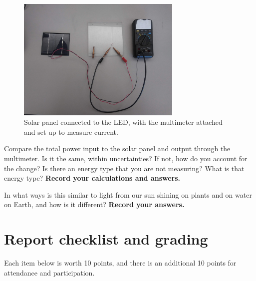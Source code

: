 \begin{steps}
\begin{figure}
	\centering
	\includegraphics[width=0.7\textwidth]{energy-trans/solar-led-ma}
	\caption{Solar panel connected to the LED, with the multimeter attached and set up to measure current.}\label{et:fig:solar-led-ma}
\end{figure}

	\item Compare the total power input to the solar panel and output through the multimeter. Is it the same, within uncertainties? If not, how do you account for the change? Is there an energy type that you are not measuring? What is that energy type? \textbf{Record your calculations and answers.}
	
	\item In what ways is this similar to light from our sun shining on plants and on water on Earth, and how is it different? \textbf{Record your answers.}
\end{steps}

\section{Report checklist and grading}

Each item below is worth 10 points, and there is an additional 10 points for attendance and participation.


